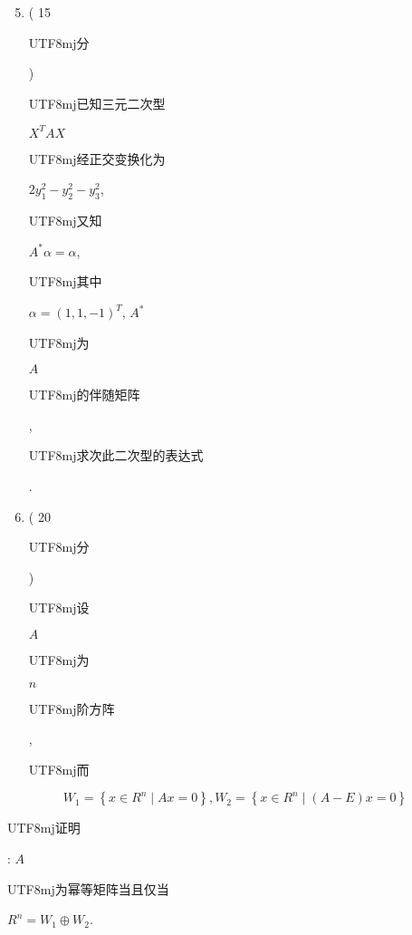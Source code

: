 \documentclass[10pt]{article}
\begin{document}
\begin{enumerate}
  \setcounter{enumi}{4}
  \item ( 15 \begin{CJK}{UTF8}{mj}分\end{CJK}) \begin{CJK}{UTF8}{mj}已知三元二次型\end{CJK} $X^{T} A X$ \begin{CJK}{UTF8}{mj}经正交变换化为\end{CJK} $2 y_{1}^{2}-y_{2}^{2}-y_{3}^{2}$, \begin{CJK}{UTF8}{mj}又知\end{CJK} $A^{*} \alpha=\alpha$, \begin{CJK}{UTF8}{mj}其中\end{CJK} $\alpha=(1,1,-1)^{T}$, $A^{*}$ \begin{CJK}{UTF8}{mj}为\end{CJK} $A$ \begin{CJK}{UTF8}{mj}的伴随矩阵\end{CJK}, \begin{CJK}{UTF8}{mj}求次此二次型的表达式\end{CJK}.

  \item ( 20 \begin{CJK}{UTF8}{mj}分\end{CJK}) \begin{CJK}{UTF8}{mj}设\end{CJK} $A$ \begin{CJK}{UTF8}{mj}为\end{CJK} $n$ \begin{CJK}{UTF8}{mj}阶方阵\end{CJK}, \begin{CJK}{UTF8}{mj}而\end{CJK}

\end{enumerate}
$$
W_{1}=\left\{x \in R^{n} \mid A x=0\right\}, W_{2}=\left\{x \in R^{n} \mid(A-E) x=0\right\}
$$
\begin{CJK}{UTF8}{mj}证明\end{CJK}: $A$ \begin{CJK}{UTF8}{mj}为幂等矩阵当且仅当\end{CJK} $R^{n}=W_{1} \oplus W_{2}$.
\end{document}
